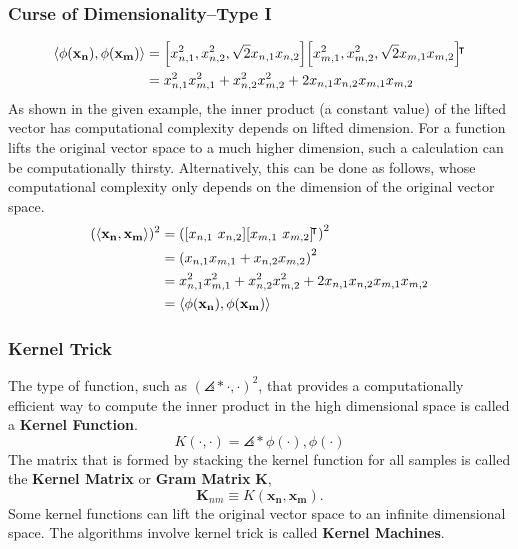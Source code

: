 \documentclass[10pt]{../formats/RU}
\begin{document}
\begin{frame}
\frametitle{Curse of Dimensionality--Type I}
  \begin{align*}
    \angles*{\phi(\mathbf{x_n}), \phi(\mathbf{x_m})}
    &= \bracks*{x_{n,1}^2 , x_{n,2}^2 , \sqrt{2}x_{n,1}x_{n,2}}\bracks*{x_{m,1}^2 , x_{m,2}^2 , \sqrt{2}x_{m,1}x_{m,2}}\trn \\
    &= x_{n,1}^2x_{m,1}^2 + x_{n,2}^2x_{m,2}^2 + 2x_{n,1}x_{n,2}x_{m,1}x_{m,2}
  \end{align*}
As shown in the given example, the inner product (a constant value) of the lifted vector has computational complexity depends on lifted dimension. For a function lifts the original vector space to a much higher dimension, such a calculation can be computationally thirsty. Alternatively, this can be done as follows, whose computational complexity only depends on the dimension of the original vector space.
  \begin{align*}
    (\angles*{\mathbf{x_n}, \mathbf{x_m}})^2
    &= \parens*{\bracks*{x_{n,1} \ x_{n,2}}\bracks*{x_{m,1} \ x_{m,2}}\trn}^2 \\
    &= \parens*{x_{n,1}x_{m,1} + x_{n,2}x_{m,2}}^2 \\
    &= x_{n,1}^2x_{m,1}^2 + x_{n,2}^2x_{m,2}^2 + 2x_{n,1}x_{n,2}x_{m,1}x_{m,2} \\
    &= \angles*{\phi(\mathbf{x_n}), \phi(\mathbf{x_m})}
  \end{align*}
\end{frame}
\begin{frame}
  \frametitle{Kernel Trick}
  The type of function, such as $(\angles*{\cdot, \cdot})^2$, that provides a computationally efficient way to compute the inner product in the high dimensional space is called a \textbf{Kernel Function}.
  \[
    K(\cdot,\cdot) = \angles*{\phi(\cdot),\phi(\cdot)}
  \]
  The matrix that is formed by stacking the kernel function for all samples is called the \textbf{Kernel Matrix} or \textbf{Gram Matrix} $\mathbf{K}$,
  \[
    \mathbf{K}_{nm} \equiv K(\mathbf{x_n}, \mathbf{x_m}).
  \]
  Some kernel functions can lift the original vector space to an infinite dimensional space.
  The algorithms involve kernel trick is called \textbf{Kernel Machines}.
\end{frame}
\end{document}
